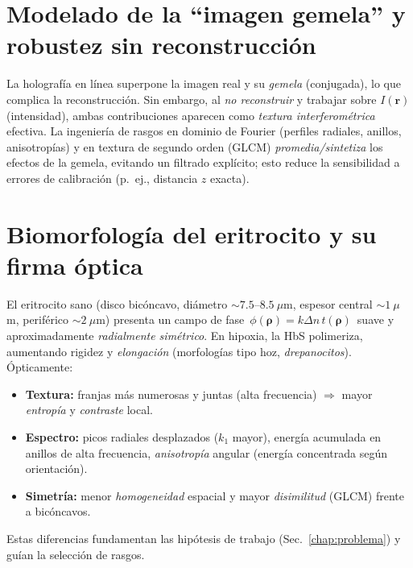 \section{Modelado de la “imagen gemela” y robustez sin reconstrucción}
La holografía en línea superpone la imagen real y su \emph{gemela} (conjugada), lo que complica la reconstrucción. Sin embargo, al \emph{no reconstruir} y trabajar sobre $I(\mathbf{r})$ (intensidad), ambas contribuciones aparecen como \emph{textura interferométrica} efectiva. La ingeniería de rasgos en dominio de Fourier (perfiles radiales, anillos, anisotropías) y en textura de segundo orden (GLCM) \emph{promedia/sintetiza} los efectos de la gemela, evitando un filtrado explícito; esto reduce la sensibilidad a errores de calibración (p.~ej., distancia $z$ exacta).

\section{Biomorfología del eritrocito y su firma óptica}
El eritrocito sano (disco bicóncavo, diámetro $\sim 7.5$–$8.5~\mu$m, espesor central $\sim 1~\mu$m, periférico $\sim 2~\mu$m) presenta un campo de fase $\,\phi(\boldsymbol{\rho})=k\Delta n\,t(\boldsymbol{\rho})\,$ suave y aproximadamente \emph{radialmente simétrico}. En hipoxia, la HbS polimeriza, aumentando rigidez y \emph{elongación} (morfologías tipo hoz, \emph{drepanocitos}). Ópticamente:
\begin{itemize}
\item \textbf{Textura:} franjas más numerosas y juntas (alta frecuencia) $\Rightarrow$ mayor \emph{entropía} y \emph{contraste} local.
\item \textbf{Espectro:} picos radiales desplazados ($k_1$ mayor), energía acumulada en anillos de alta frecuencia, \emph{anisotropía} angular (energía concentrada según orientación).
\item \textbf{Simetría:} menor \emph{homogeneidad} espacial y mayor \emph{disimilitud} (GLCM) frente a bicóncavos.
\end{itemize}
Estas diferencias fundamentan las hipótesis de trabajo (Sec.~\ref{chap:problema}) y guían la selección de rasgos.

